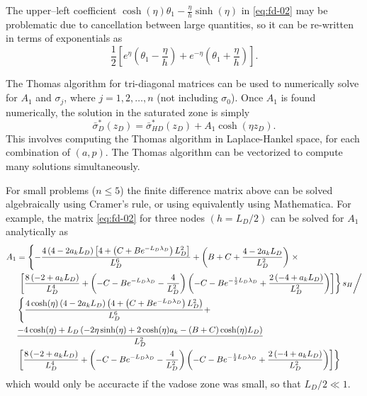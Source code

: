 \documentclass[12pt,letterpaper]{article}
\begin{document}
The upper--left coefficient $\cosh(\eta)\theta_1 - \frac{\eta}{h}\sinh(\eta)$ in
\eqref{eq:fd-02} may be problematic due to cancellation between large
quantities, so it can be re-written in terms of exponentials as 
\begin{equation}
 \nonumber
 \frac{1}{2} \left[ e^{\eta} \left( \theta_1 - \frac{\eta}{h}\right) + e^{-\eta}
   \left( \theta_1 + \frac{\eta}{h}\right) \right].
\end{equation}

The Thomas algorithm for tri-diagonal matrices can be used to
numerically solve for $A_1$ and $\sigma_j$, where $j=1,2, \dots, n$
(not including $\sigma_0$).  Once $A_1$ is found numerically, the
solution in the saturated zone is simply 
\begin{equation}
 \nonumber
 \bar{\sigma}^{\ast}_{D}(z_D) = \bar{\sigma}^{\ast}_{HD}(z_D) + A_1
 \cosh(\eta z_D).
\end{equation}
This involves computing the Thomas algorithm in Laplace-Hankel space,
for each combination of $(a,p)$.  The Thomas algorithm can be
vectorized to compute many solutions simultaneously.

For small problems ($n \le 5$) the finite difference matrix above can
be solved algebraically using Cramer's rule, or using equivalently
using Mathematica.  For example, the matrix \eqref{eq:fd-02} for three nodes $(h=L_D/2)$ can be solved for $A_1$ analytically as
\begin{align}
  \label{eq:AsolnMathematica}
  A_1&=\left\lbrace-\frac{4 \left(4-2 a_k L_D\right) \left[4+\left(C+B e^{-L_D \lambda _D}\right) L_D^2\right]}{L_D^6}+\left(B+C+\frac{4-2 a_k L_D}{L_D^2}\right) \right.  \times \notag\\
      & \left.\left.\left[\frac{8 \left(-2+a_k L_D\right)}{L_D^4}+\left(-C-B e^{-L_D \lambda _D}-\frac{4}{L_D^2}\right) \left(-C-B e^{-\frac{1}{2} L_D \lambda _D}+\frac{2 \left(-4+a_k L_D\right)}{L_D^2}\right)\right]\right\rbrace s_H \right/\notag\\
  &\left\lbrace\frac{4 \cosh(\eta) \left(4-2 a_k L_D\right) \left(4+\left(C+B e^{-L_D \lambda _D}\right) L_D^2\right)}{L_D^6}+\right. \\
    &\frac{-4 \cosh(\eta)+L_D \left(-2 \eta  \sinh(\eta)+2 \cosh(\eta) a_k-(B+C) \cosh(\eta) L_D\right)}{L_D^2} \notag\\
    &\left.\left[\frac{8 \left(-2+a_k L_D\right)}{L_D^4}+\left(-C-B e^{-L_D \lambda _D}-\frac{4}{L_D^2}\right) \left(-C-B e^{-\frac{1}{2} L_D \lambda _D}+\frac{2 \left(-4+a_k L_D\right)}{L_D^2}\right)\right]\right\rbrace \notag
\end{align}
which would only be accuracte if the vadose zone was small, so that $L_D/2 \ll 1$. 



\end{document}
